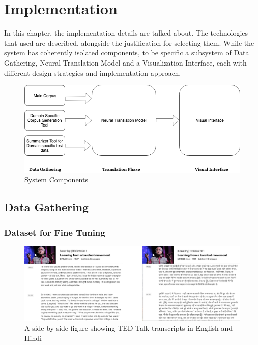 \chapter{Implementation}
In this chapter, the implementation details are talked about. The technologies that used are described, alongside the justification for selecting them. While the system has coherently isolated components, to be specific a subsystem of Data Gathering, Neural Translation Model and a Visualization Interface, each with different design strategies and implementation approach.

\begin{figure}[h]
\includegraphics[width=\textwidth]{figures/maindesign.png}
\caption{System Components} \label{system}
\end{figure}

\section{Data Gathering}
\subsection{Dataset for Fine Tuning}
\begin{figure}
\includegraphics[width=\textwidth]{figures/tedtalks.png}
\caption{A side-by-side figure showing TED Talk transcripts in English and Hindi} \label{fig1}
\end{figure}

